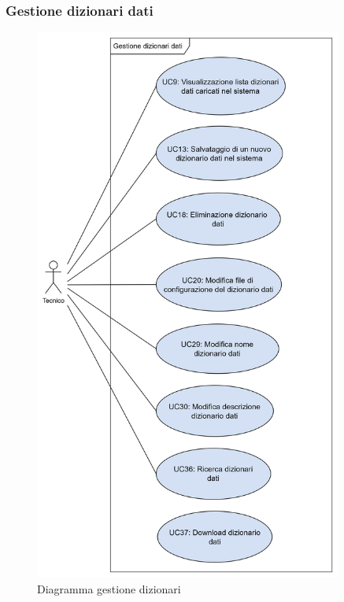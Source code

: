 \subsubsection*{Gestione dizionari dati}
\begin{figure}[H]
  \centering
  \includegraphics[width=0.90\textwidth, height=0.90\textheight]{assets/gestione_dizionari.png}
  \caption{Diagramma gestione dizionari}
\end{figure}










